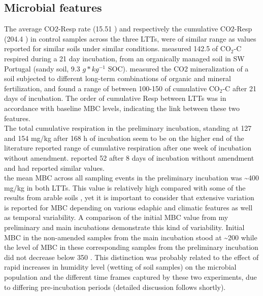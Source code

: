 	\subsection{Microbial features}
	The average CO2-Resp rate (15.51 \respunit) and respectively the cumulative CO2-Resp (204.4 \cumrespunit) in control samples across the three LTTs, were of similar range as values reported for similar soils under similar conditions. \citet{ribeiro2010} measured 142.5 \genericunit of CO$ _2 $-C respired during a 21 day incubation, from an organically managed soil in SW Portugal (sandy soil, 9.3 $ g * kg^{-1} $ SOC). \citet{rudrappa2006} measured the CO2 mineralization of a soil subjected to different long-term combinations of organic and mineral fertilization, and found a range of between 100-150 \genericunit of cumulative CO$ _2 $-C after 21 days of incubation.
	The order of cumulative Resp between LTTs was in accordance with baseline MBC levels, indicating the link between these two features. \\
	The total cumulative respiration in the preliminary incubation, standing at 127 and 154 mg/kg after 168 h of incubation seem to be on the higher end of the literature reported range of cumulative respiration after one week of incubation without amendment. \citet{ribeiro2010} reported 52 \cumrespunit after 8 days of incubation without amendment and \citet{kemmitt2008} had reported similar values. \\
	the mean MBC across all sampling events in the preliminary incubation was \~{}400 mg/kg in both LTTs. This value is relatively high compared with some of the results from arable soils \citep{jat2020, haynes1999,garcia-orenes2010}, yet it is important to consider that extensive variation is reported for MBC depending on various edaphic and climatic features as well as temporal variability. A comparison of the initial MBC value from my preliminary and main incubations demonstrate this kind of variability. Initial MBC in the non-amended samples from the main incubation stood at \~{}200 \genericunit while the level of MBC in these corresponding samples from the preliminary incubation did not decrease below 350 \genericunit. This distinction was probably related to the effect of rapid increases in humidity level (wetting of soil samples) on the microbial population and the different time frames captured by these two experiments, due to differing pre-incubation periods (detailed discussion follows shortly).\\
